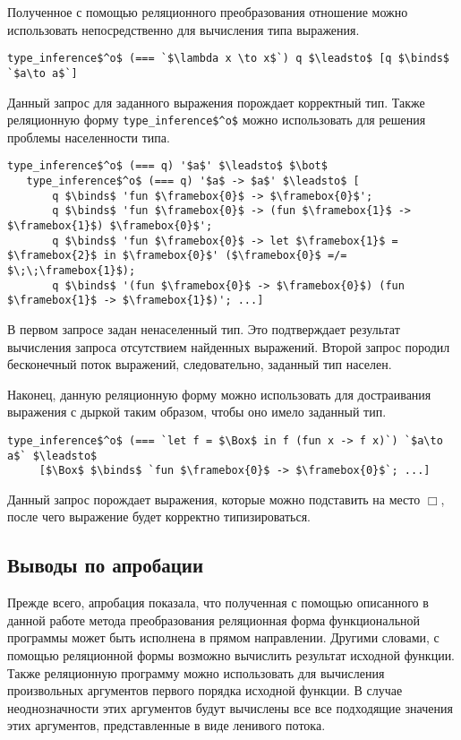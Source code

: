 Полученное с помощью реляционного преобразования отношение можно использовать непосредственно для вычисления типа выражения. 

\begin{lstlisting}[basicstyle=\small]
   type_inference$^o$ (=== `$\lambda x \to x$`) q $\leadsto$ [q $\binds$ `$a\to a$`]
\end{lstlisting}

Данный запрос для заданного выражения порождает корректный тип. Также реляционную форму \lstinline|type_inference$^o$| можно использовать для решения проблемы населенности типа.

\begin{lstlisting}[basicstyle=\small]
   type_inference$^o$ (=== q) '$a$' $\leadsto$ $\bot$
   type_inference$^o$ (=== q) '$a$ -> $a$' $\leadsto$ [
       q $\binds$ 'fun $\framebox{0}$ -> $\framebox{0}$'; 
       q $\binds$ 'fun $\framebox{0}$ -> (fun $\framebox{1}$ -> $\framebox{1}$) $\framebox{0}$'; 
       q $\binds$ 'fun $\framebox{0}$ -> let $\framebox{1}$ = $\framebox{2}$ in $\framebox{0}$' ($\framebox{0}$ =/= $\;\;\framebox{1}$);
       q $\binds$ '(fun $\framebox{0}$ -> $\framebox{0}$) (fun $\framebox{1}$ -> $\framebox{1}$)'; ...]
\end{lstlisting}

В первом запросе задан ненаселенный тип. Это подтверждает результат
вычисления запроса отсутствием найденных выражений. Второй запрос
породил бесконечный поток выражений, следовательно, заданный тип
населен.

Наконец, данную реляционную форму можно использовать для достраивания
выражения с дыркой таким образом, чтобы оно имело заданный тип.

\begin{lstlisting}[basicstyle=\small]
   type_inference$^o$ (=== `let f = $\Box$ in f (fun x -> f x)`) `$a\to a$` $\leadsto$ 
     [$\Box$ $\binds$ `fun $\framebox{0}$ -> $\framebox{0}$`; ...]
\end{lstlisting}

Данный запрос порождает выражения, которые можно подставить на место $\Box$,
после чего выражение будет корректно типизироваться.

\subsection{Выводы по апробации}

Прежде всего, апробация показала, что полученная с помощью описанного в данной работе метода преобразования реляционная форма функциональной программы может быть исполнена в прямом направлении. Другими словами, с помощью реляционной формы возможно вычислить результат исходной функции. Также реляционную программу можно использовать для вычисления произвольных аргументов первого порядка исходной функции. В случае неоднозначности этих аргументов будут вычислены все все подходящие значения этих аргументов, представленные в виде ленивого потока.

